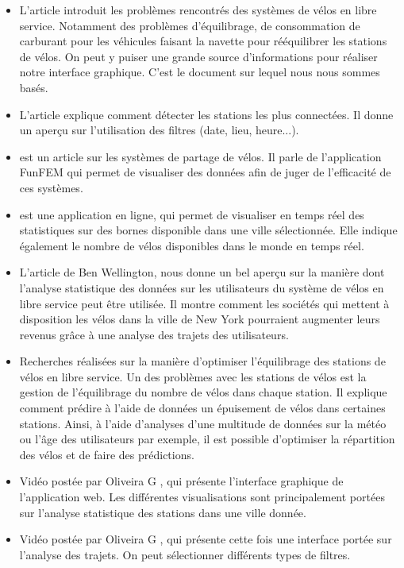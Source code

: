 \documentclass[12pt]{article}
\begin{document}
		\begin{itemize}
			\item L'article \cite{Oli16} introduit les problèmes rencontrés
			des systèmes de vélos en libre service. Notamment des problèmes d'équilibrage,
			de consommation de carburant pour les véhicules faisant la navette pour
			rééquilibrer les stations de vélos. On peut y puiser une grande source
			d'informations pour réaliser notre interface graphique. C'est le document sur
			lequel nous nous sommes basés.

			\item L'article \cite{Ali14} explique comment détecter les stations les plus
			connectées. Il donne un aperçu sur l'utilisation des filtres (date, lieu, heure...).

			\item \cite{BC16} est un article sur les systèmes de partage de vélos. Il parle
			de l'application FunFEM qui permet de visualiser des données afin de juger de
			l'efficacité de ces systèmes.

			\item \cite{BSM17} est une application en ligne, qui permet de visualiser en
			temps réel des statistiques sur des bornes disponible dans une ville
			sélectionnée.  Elle indique également le nombre de vélos disponibles dans le
			monde en temps réel.

			\item L'article \cite{BW} de Ben Wellington, nous donne un bel aperçu sur la
			manière dont l'analyse statistique des données sur les utilisateurs du système de
			vélos en libre service peut être utilisée. Il montre comment les sociétés qui
			mettent à disposition les vélos dans la ville de New York pourraient augmenter
			leurs revenus grâce à une analyse des trajets des utilisateurs.

			\item \cite{JL} Recherches réalisées sur la manière d'optimiser l'équilibrage
			des stations de vélos en libre service. Un des problèmes avec les stations de vélos
			est la gestion de l'équilibrage du nombre de vélos dans chaque station. Il explique
			comment prédire à l'aide de données un épuisement de vélos dans certaines stations.
			Ainsi, à l'aide d'analyses d'une multitude de données sur la météo ou l'âge des
			utilisateurs par exemple, il est possible d'optimiser la répartition des vélos et
			de faire des prédictions.

			\item Vidéo postée par Oliveira G \cite{state_station}, qui présente l'interface
			graphique de l'application web. Les différentes visualisations sont principalement
			portées sur l'analyse statistique des stations dans une ville donnée.

			\item Vidéo postée par Oliveira G \cite{trips}, qui présente cette fois une
			interface portée sur l'analyse des trajets. On peut sélectionner différents types
			de filtres.

		\end{itemize}
\end{document}
